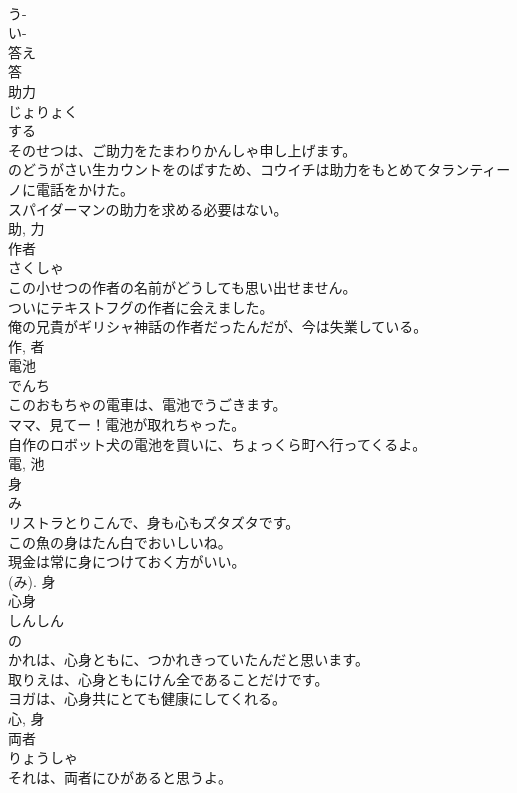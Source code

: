 \documentclass[8pt]{extreport}
\begin{document}
\begin{CJK}{UTF8}{min}
\\	う-
\\	い-
\\	答え 
\\	答	
\\	助力	
\\	じょりょく	
\\	する 
\\	そのせつは、ご助力をたまわりかんしゃ申し上げます。	
\\	のどうがさい生カウントをのばすため、コウイチは助力をもとめてタランティーノに電話をかけた。	
\\	スパイダーマンの助力を求める必要はない。	
\\	助, 力	
\\	作者	
\\	さくしゃ	
\\	この小せつの作者の名前がどうしても思い出せません。	
\\	ついにテキストフグの作者に会えました。	
\\	俺の兄貴がギリシャ神話の作者だったんだが、今は失業している。	
\\	作, 者	
\\	電池	
\\	でんち	
\\	このおもちゃの電車は、電池でうごきます。	
\\	ママ、見てー！電池が取れちゃった。	
\\	自作のロボット犬の電池を買いに、ちょっくら町へ行ってくるよ。	
\\	電, 池	
\\	身	
\\	み	
\\	リストラとりこんで、身も心もズタズタです。	
\\	この魚の身はたん白でおいしいね。	
\\	現金は常に身につけておく方がいい。	
\\	(み).	身	
\\	心身	
\\	しんしん	
\\	の 
\\	かれは、心身ともに、つかれきっていたんだと思います。	
\\	取りえは、心身ともにけん全であることだけです。	
\\	ヨガは、心身共にとても健康にしてくれる。	
\\	心, 身	
\\	両者	
\\	りょうしゃ	
\\	それは、両者にひがあると思うよ。	

\end{CJK}
\end{document}
